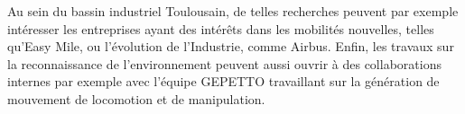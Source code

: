 \documentclass[11pt,a4paper,sans]{moderncv}         %
\begin{document}
Au sein du bassin industriel Toulousain, de telles recherches peuvent par exemple intéresser les entreprises ayant des intérêts dans les mobilités nouvelles, telles qu'Easy Mile, ou l'évolution de l'Industrie, comme Airbus. Enfin, les travaux sur la reconnaissance de l'environnement peuvent aussi ouvrir à des collaborations internes par exemple avec l'équipe GEPETTO travaillant sur la génération de mouvement de locomotion et de manipulation.






\end{document}
